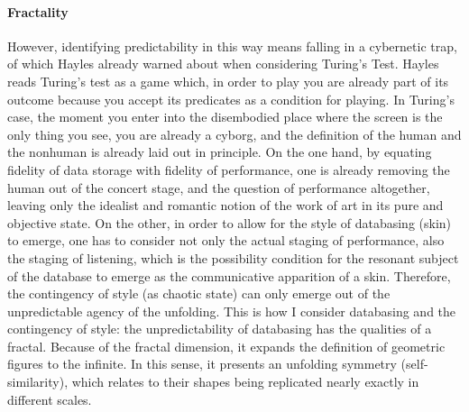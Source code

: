 
\paragraph{Fractality}
However, identifying predictability in this way means falling in a cybernetic trap, of which Hayles already warned about when considering Turing's Test. Hayles reads Turing's test as a game which, in order to play you are already part of its outcome because you accept its predicates as a condition for playing. In Turing's case, the moment you enter into the disembodied place where the screen is the only thing you see, you are already a cyborg, and the definition of the human and the nonhuman is already laid out in principle. On the one hand, by equating fidelity of data storage with fidelity of performance, one is already removing the human out of the concert stage, and the question of performance altogether, leaving only the idealist and romantic notion of the work of art in its pure and objective state. On the other, in order to allow for the style of databasing (skin) to emerge, one has to consider not only the actual staging of performance, also the staging of listening, which is the possibility condition for the resonant subject of the database to emerge as the communicative apparition of a skin. Therefore, the contingency of style (as chaotic state) can only emerge out of the unpredictable agency of the unfolding. This is how I consider databasing and the contingency of style: the unpredictability of databasing has the qualities of a fractal. Because of the fractal dimension, it expands the definition of geometric figures to the infinite. In this sense, it presents an unfolding symmetry (self-similarity), which relates to their shapes being replicated nearly exactly in different scales. 

